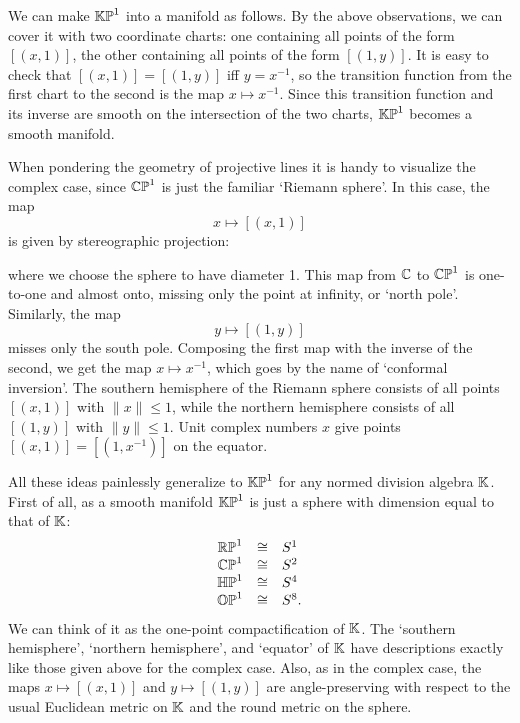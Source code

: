 We can make ${\mathbb {KP}}^1$ into a manifold as follows.  By the above 
observations, we can cover it with two coordinate charts: one containing 
all points of the form $[(x,1)]$, the other containing all points of the 
form $[(1,y)]$.   It is easy to check that $[(x,1)] = [(1,y)]$ iff $y = 
x^{-1}$, so the transition function from the first chart to the second 
is the map $x \mapsto x^{-1}$.  Since this transition function and its 
inverse are smooth on the intersection of the two charts, ${\mathbb {KP}}^1$ 
becomes a smooth manifold.  

When pondering the geometry of projective lines it is handy to
visualize the complex case, since ${\mathbb {CP}}^1$ is just the familiar
`Riemann sphere'.  In this case, the map   
\[    x \mapsto [(x,1)]    \]  
is given by stereographic projection: 
  
\begin{figure}[h]   
\centerline{\epsfysize=1.5in}   
\label{stereo}   
\end{figure}   
  
\noindent  
where we choose the sphere to have diameter 1.   This map from ${\mathbb C}$ to 
${\mathbb {CP}}^1$ is one-to-one and almost onto, missing only the point at 
infinity, or `north pole'.  Similarly, the map  
\[    y \mapsto [(1,y)]    \]  
misses only the south pole. Composing the first map with the inverse of 
the second, we get the map  $x \mapsto x^{-1}$, which goes by the name 
of `conformal inversion'.  The southern hemisphere of the Riemann 
sphere consists of all points $[(x,1)]$ with $\|x\| \le 1$, while the 
northern hemisphere consists of all $[(1,y)]$ with $\|y\| \le 1$.  Unit 
complex numbers $x$ give points $[(x,1)] = [(1,x^{-1})]$ on the equator.    
  
All these ideas painlessly generalize to ${\mathbb {KP}}^1$ for any normed division  
algebra ${\mathbb K}$.  First of all, as a smooth manifold ${\mathbb {KP}}^1$ is just a   
sphere with dimension equal to that of ${\mathbb K}$:  
\[  
\begin{array}{ccl}       
          {\mathbb {RP}}^1 &\cong& S^1   \\  
          {\mathbb {CP}}^1 &\cong& S^2   \\  
          {\mathbb {HP}}^1 &\cong& S^4   \\  
          {\mathbb {OP}}^1 &\cong& S^8.  
\end{array}   
\]  
We can think of it as the one-point compactification of ${\mathbb K}$.   The  
`southern hemisphere', `northern hemisphere', and `equator' of ${\mathbb K}$ have 
descriptions exactly like those given above for the complex case.  Also, 
as in the complex case, the maps $x \mapsto [(x,1)]$ and $y \mapsto [(1,y)]$ 
are angle-preserving with respect to the usual Euclidean metric on ${\mathbb K}$ 
and the round metric on the sphere.   

